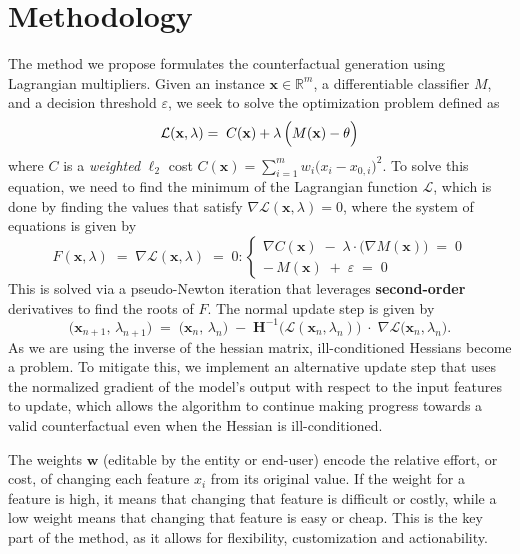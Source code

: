 \documentclass[12pt]{extarticle}
\numberwithin{equation}{section}
\begin{document}
\section*{Methodology}
The method we propose formulates the counterfactual generation using Lagrangian multipliers. Given an instance $\mathbf{x}\! \in\! \mathbb{R}^m$, a differentiable classifier $M$, and a decision threshold $\varepsilon$, we seek to solve the optimization problem defined as
\begin{equation}
\mathcal{L}(\mathbf{x}, \lambda) = \; C(\mathbf{x}) + \lambda \, \Bigl(M(\mathbf{x}) - \theta \Bigr)
\end{equation}
where $C$ is a \emph{weighted} $\ell_2$ cost
$
C(\mathbf{x}) = \sum_{i=1}^m w_i\bigl(x_i - x_{0,i}\bigr)^2$. To solve this equation, we need to find the minimum of the Lagrangian function $\mathcal{L}$, which is done by finding the values that satisfy $\nabla \mathcal{L}(\mathbf{x}, \lambda) = 0$, where the system of equations is given by
\[
F(\mathbf{x}, \lambda) \;=\; \nabla \mathcal{L}(\mathbf{x}, \lambda) \;=\; 0:
\begin{cases}
\nabla C(\mathbf{x}) \;-\;\lambda \cdot \bigl(\nabla M(\mathbf{x})\bigr) \;=\; 0 \\
-\,M(\mathbf{x})\;+\;\varepsilon\;=\;0
\end{cases}
\]
This is solved via a pseudo-Newton iteration that leverages \textbf{second-order} derivatives to find the roots of $F$. The normal update step is given by
\[
\bigl(\mathbf{x}_{n+1},\,\lambda_{n+1}\bigr)
\;=\;
\bigl(\mathbf{x}_n,\,\lambda_n\bigr)
\;-\;
\mathbf{H}^{-1}\!\bigl(\mathcal{L}(\mathbf{x}_n,\lambda_n)\bigr)
\;\cdot\;
\nabla\mathcal{L}\bigl(\mathbf{x}_n,\lambda_n\bigr).
\]
As we are using the inverse of the hessian matrix, ill-conditioned Hessians become a problem. To mitigate this, we implement an alternative update step that uses the normalized gradient of the model's output with respect to the input features to update, which allows the algorithm to continue making progress towards a valid counterfactual even when the Hessian is ill-conditioned.

The weights $\mathbf{w}$ (editable by the entity or end-user) encode the relative effort, or cost, of changing each feature $x_i$ from its original value. If the weight for a feature is high, it means that changing that feature is difficult or costly, while a low weight means that changing that feature is easy or cheap. This is the key part of the method, as it allows for flexibility, customization and actionability. 
\end{document}
